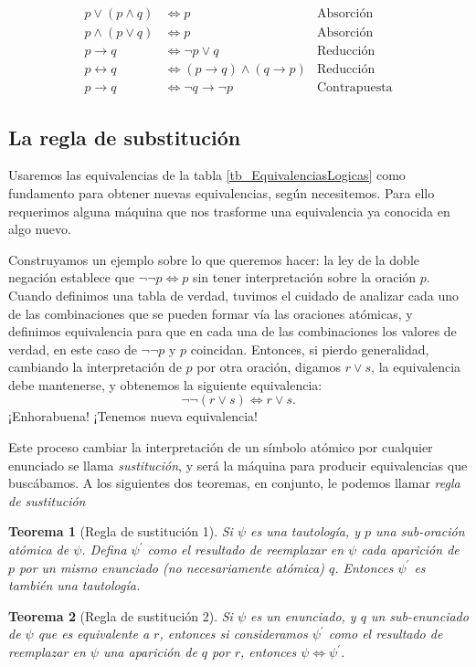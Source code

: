 \documentclass{book}
\newtheorem{thm}{Teorema}[chapter]
\theoremstyle{definition}
\begin{document}
\begin{table}[h]
\begin{align*}
	p \vee (p \wedge q) &\iff p & \text{Absorción} \\
	p \wedge (p \vee q) & \iff p & \text{Absorción}\\
	p \rightarrow q &\iff \neg p \vee q & \text{Reducción}\\
	p \leftrightarrow q &\iff (p \rightarrow q) \wedge (q \rightarrow p) & \text{Reducción}\\
	p \rightarrow q &\iff \neg q \rightarrow \neg p & \text{Contrapuesta}
\end{align*}
\caption{Lista de equivalencias lógicas básicas. Todas ellas pueden ser demostradas haciendo la correspondiente tabla de verdad. A la derecha aparece un nombre para cada una de ellas.}
\label{tb_EquivalenciasLogicas}
\end{table}

\subsection{La regla de substitución}
Usaremos las equivalencias de la tabla \ref{tb_EquivalenciasLogicas} como fundamento para obtener nuevas equivalencias, según necesitemos.
Para ello requerimos alguna máquina que nos trasforme una equivalencia ya conocida en algo nuevo.

Construyamos un ejemplo sobre lo que queremos hacer: la ley de la doble negación establece que $\neg \neg p \iff p$ sin tener interpretación sobre la oración $p$.
Cuando definimos una tabla de verdad, tuvimos el cuidado de analizar cada uno de las combinaciones que se pueden formar vía las oraciones atómicas, y definimos equivalencia para que en cada una de las combinaciones los valores de verdad, en este caso de $\neg \neg p$ y $p$ coincidan.
Entonces, si pierdo generalidad, cambiando la interpretación de $p$ por otra oración, digamos $r \vee s$, la equivalencia debe mantenerse, y obtenemos la siguiente equivalencia: \[\neg \neg (r \vee s) \iff r \vee s. \]
¡Enhorabuena! ¡Tenemos nueva equivalencia!

Este proceso cambiar la interpretación de un símbolo atómico por cualquier enunciado se llama \emph{sustitución}, y será la máquina para producir equivalencias que buscábamos.
A los siguientes dos teoremas, en conjunto, le podemos llamar \emph{regla de sustitución}
\begin{thm}[Regla de sustitución 1]
	Si $\psi$ es una tautología, y $p$ una sub-oración atómica de $\psi$. Defina $\psi^\prime$ como el resultado de reemplazar en $\psi$ cada aparición de $p$ por un mismo enunciado (no necesariamente atómica) $q$. Entonces $\psi^\prime$ es también una tautología.
\end{thm}
\begin{thm}[Regla de sustitución 2]
	Si $\psi$ es un enunciado, y $q$ un sub-enunciado de $\psi$ que es equivalente a $r$, entonces si consideramos $\psi^\prime$ como el resultado de reemplazar en $\psi$ una aparición de $q$ por $r$, entonces $\psi \iff \psi^\prime$.
\end{thm}
\end{document}
